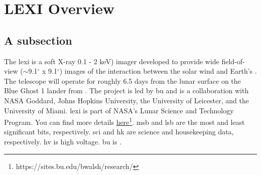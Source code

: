 \documentclass[12pt]{scrartcl}
\newcommand{\sectionnumbering}[1]{%
  \setcounter{section}{0}%
  \renewcommand{\thesection}{\csname #1\endcsname{section}}%
}
\newcommand\npnpn[1]{\clearpage\thispagestyle{empty}\addtocounter{page}{-1} \ \clearpage}
\begin{document}
    
    \cleardoubleoddpage

    \sectionnumbering{Roman}
    \tableofcontents
    \cleardoubleoddpage
    \listoffigures
    \cleardoubleoddpage
    \listoftables
    \cleardoubleoddpage

    \printglossary[type=\acronymtype, title=Glossary of Abbreviations, toctitle=Glossary]

    
    \cleardoubleoddpage

    \sectionnumbering{arabic}
    \section[LEXI Overview]{LEXI Overview}
        \subsection[Short tile 1]{A subsection}
            The \gls{lexi} \citep{Kuntz2022} is a soft X-ray 0.1 - 2 keV) imager developed to
            provide wide field-of-view ($\sim$9.1$^{\circ}$ x 9.1$^{\circ}$) images of the
            interaction between the solar wind and Earth’s . The telescope will
            operate for roughly 6.5 days from the lunar surface on the Blue Ghost 1 lander from 
            . The project is led by \gls{bu} and is a collaboration with NASA 
            Goddard, Johns Hopkins University, the University of Leicester, and the University of
            Miami. \gls{lexi} is part of NASA’s Lunar Science and Technology Program. You
            can find more details \href{https://sites.bu.edu/bwalsh/research/}{here}\footnote[1]
            {https://sites.bu.edu/bwalsh/research/}. \gls{msb} and \gls{lsb} are the most and least
            significant bits, respectively. \gls{sci} and \gls{hk} are science and housekeeping
            data, respectively. \gls{hv} is high voltage. \gls{bu} is  
            .
\end{document}
